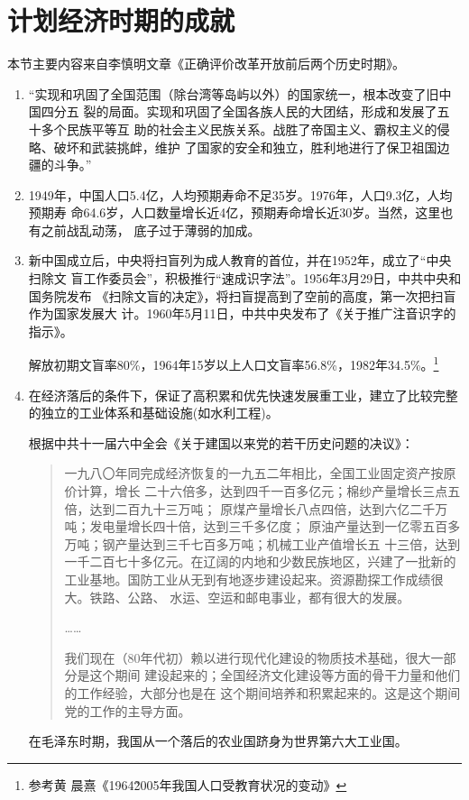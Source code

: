 \section{计划经济时期的成就}

本节主要内容来自李慎明文章《正确评价改革开放前后两个历史时期》。

\begin{enumerate}

\item “实现和巩固了全国范围（除台湾等岛屿以外）的国家统一，根本改变了旧中国四分五
  裂的局面。实现和巩固了全国各族人民的大团结，形成和发展了五十多个民族平等互
  助的社会主义民族关系。战胜了帝国主义、霸权主义的侵略、破坏和武装挑衅，维护
  了国家的安全和独立，胜利地进行了保卫祖国边疆的斗争。”

\item 1949年，中国人口5.4亿，人均预期寿命不足35岁。1976年，人口9.3亿，人均预期寿
  命64.6岁，人口数量增长近4亿，预期寿命增长近30岁。当然，这里也有之前战乱动荡，
  底子过于薄弱的加成。

\item 新中国成立后，中央将扫盲列为成人教育的首位，并在1952年，成立了“中央扫除文
  盲工作委员会”，积极推行“速成识字法”。1956年3月29日，中共中央和国务院发布
  《扫除文盲的决定》，将扫盲提高到了空前的高度，第一次把扫盲作为国家发展大
  计。1960年5月11日，中共中央发布了《关于推广注音识字的指示》。

  解放初期文盲率80\%，1964年15岁以上人口文盲率56.8\%，1982年34.5\%。\footnote{参考黄
    晨熹《1964\~2005年我国人口受教育状况的变动》}

\item 在经济落后的条件下，保证了高积累和优先快速发展重工业，建立了比较完整
  的独立的工业体系和基础设施(如水利工程)。

  根据中共十一届六中全会《关于建国以来党的若干历史问题的决议》：
  \begin{quotation}
    一九八〇年同完成经济恢复的一九五二年相比，全国工业固定资产按原价计算，增长
    二十六倍多，达到四千一百多亿元；棉纱产量增长三点五倍，达到二百九十三万吨；
    原煤产量增长八点四倍，达到六亿二千万吨；发电量增长四十倍，达到三千多亿度；
    原油产量达到一亿零五百多万吨；钢产量达到三千七百多万吨；机械工业产值增长五
    十三倍，达到一千二百七十多亿元。在辽阔的内地和少数民族地区，兴建了一批新的
    工业基地。国防工业从无到有地逐步建设起来。资源勘探工作成绩很大。铁路、公路、
    水运、空运和邮电事业，都有很大的发展。

    ……

    我们现在（80年代初）赖以进行现代化建设的物质技术基础，很大一部分是这个期间
    建设起来的；全国经济文化建设等方面的骨干力量和他们的工作经验，大部分也是在
    这个期间培养和积累起来的。这是这个期间党的工作的主导方面。
  \end{quotation}
  在毛泽东时期，我国从一个落后的农业国跻身为世界第六大工业国。


\end{enumerate}
